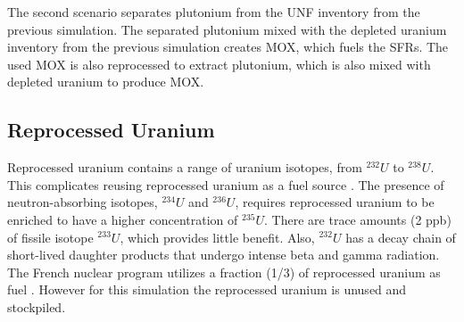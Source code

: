 The second scenario separates plutonium from the \gls{UNF}
inventory from the previous simulation. The separated
plutonium mixed with the depleted uranium inventory from the previous simulation
creates \gls{MOX}, which fuels the \gls{SFR}s. The used
\gls{MOX} is also reprocessed to extract plutonium, which is also
mixed with depleted uranium to produce \gls{MOX}.



\subsection{Reprocessed Uranium}
Reprocessed uranium contains a range of uranium isotopes, from $^{232}U$ to $^{238}U$.
This complicates reusing reprocessed uranium as a fuel source \cite{IAEA_management_2007}.
The presence of neutron-absorbing isotopes, $^{234}U$ and $^{236}U$, requires reprocessed uranium
to be enriched to have a higher concentration of $^{235}U$. There are trace amounts (2 ppb) 
of fissile isotope $^{233}U$, which provides little benefit.  
Also, $^{232}U$ has a decay chain of short-lived
daughter products that undergo intense beta and gamma radiation.
The French nuclear program utilizes a fraction (1/3) of reprocessed uranium as fuel \cite{IAEA_management_2007}.
However for this simulation the reprocessed uranium is unused and stockpiled.


